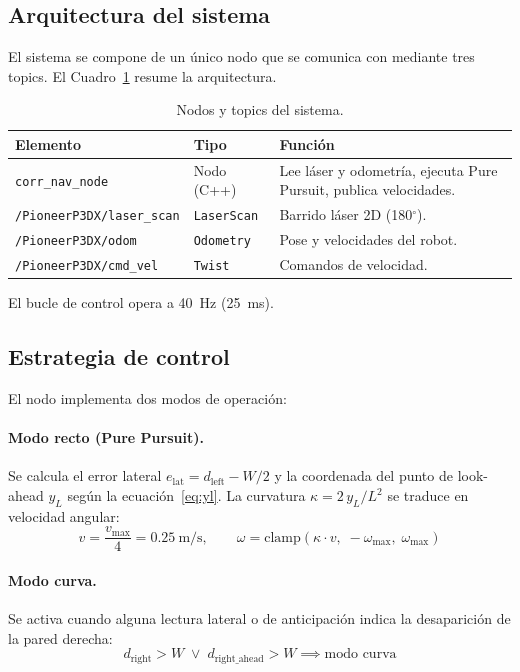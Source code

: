 \documentclass[12pt]{article}
\begin{document}
\subsection{Arquitectura del sistema}
El sistema se compone de un \'{u}nico nodo \ros{} que se comunica con \coppelia{} mediante tres topics. El Cuadro~\ref{tab:nodos} resume la arquitectura.

\begin{table}[H]
  \centering
  \caption{Nodos y topics \ros{} del sistema.}
  \label{tab:nodos}
  \begin{tabularx}{0.98\linewidth}{l l X}
    \toprule
    \textbf{Elemento} & \textbf{Tipo} & \textbf{Funci\'{o}n} \\
    \midrule
    \texttt{corr\_nav\_node}            & Nodo (C++) & Lee l\'{a}ser y odometr\'{i}a, ejecuta Pure Pursuit, publica velocidades. \\
    \texttt{/PioneerP3DX/laser\_scan}  & \texttt{LaserScan}  & Barrido l\'{a}ser 2D (180$^\circ$). \\
    \texttt{/PioneerP3DX/odom}         & \texttt{Odometry}   & Pose y velocidades del robot. \\
    \texttt{/PioneerP3DX/cmd\_vel}     & \texttt{Twist}      & Comandos de velocidad. \\
    \bottomrule
  \end{tabularx}
\end{table}

El bucle de control opera a 40~Hz (\SI{25}{\milli\second}).

\subsection{Estrategia de control}
El nodo implementa dos modos de operaci\'{o}n:

\paragraph{Modo recto (Pure Pursuit).}
Se calcula el error lateral $e_\text{lat} = d_\text{left} - W/2$ y la coordenada del punto de look-ahead $y_L$ seg\'{u}n la ecuaci\'{o}n~\eqref{eq:yl}. La curvatura $\kappa = 2\,y_L / L^2$ se traduce en velocidad angular:
\[
  v = \frac{v_\text{max}}{4} = \SI{0.25}{\meter\per\second}, \qquad
  \omega = \text{clamp}(\kappa \cdot v,\; -\omega_\text{max},\; \omega_\text{max})
\]

\paragraph{Modo curva.}
Se activa cuando alguna lectura lateral o de anticipaci\'{o}n indica la desaparici\'{o}n de la pared derecha:
\[
  d_\text{right} > W \;\lor\; d_\text{right\_ahead} > W \implies \text{modo curva}
\]
\end{document}
